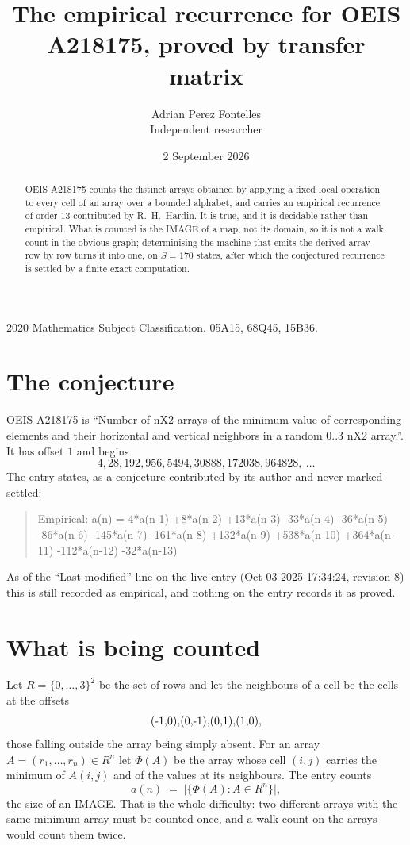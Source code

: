 \documentclass[11pt,a4paper]{article}
\title{The empirical recurrence for OEIS A218175, proved by transfer matrix}
\author{Adrian Perez Fontelles\\ \small Independent researcher}
\date{2 September 2026}
\theoremstyle{plain}
\theoremstyle{definition}
\begin{document}
\maketitle

\begin{abstract}
OEIS A218175 counts the distinct arrays obtained by applying a fixed local operation to every cell
of an array over a bounded alphabet, and carries an empirical recurrence of order $13$
contributed by R.~H.~Hardin. It is true, and it is decidable rather than empirical. What is
counted is the IMAGE of a map, not its domain, so it is not a walk count in the obvious graph;
determinising the machine that emits the derived array row by row turns it into one, on
$S=170$ states, after which the conjectured recurrence is settled by a finite exact
computation.
\end{abstract}

\noindent\small 2020 Mathematics Subject Classification. 05A15, 68Q45, 15B36.\normalsize

\section{The conjecture}

OEIS A218175 is ``Number of nX2 arrays of the minimum value of corresponding elements and their horizontal and vertical neighbors in a random 0..3 nX2 array.''. It has offset $1$ and begins
\[
4, 28, 192, 956, 5494, 30888, 172038, 964828,\ \dots
\]
The entry states, as a conjecture contributed by its author and never marked settled:
\begin{quote}
Empirical: a(n) = 4*a(n-1) +8*a(n-2) +13*a(n-3) -33*a(n-4) -36*a(n-5) -86*a(n-6) -145*a(n-7) -161*a(n-8) +132*a(n-9) +538*a(n-10) +364*a(n-11) -112*a(n-12) -32*a(n-13)
\end{quote}
As of the ``Last modified'' line on the live entry (Oct 03 2025 17:34:24, revision 8) this is still
recorded as empirical, and nothing on the entry records it as proved.

\section{What is being counted}

Let $R=\{0,\dots,3\}^{2}$ be the set of rows and let the neighbours of
a cell be the cells at the offsets
\[
$(-1,0)$, $(0,-1)$, $(0,1)$, $(1,0)$,
\]
those falling outside the array being simply absent. For an array
$A=(r_1,\dots,r_n)\in R^n$ let $\Phi(A)$ be the array whose cell $(i,j)$ carries the
minimum of $A(i,j)$ and of the values at its neighbours. The entry counts
\[
a(n)\;=\;\bigl|\{\Phi(A):A\in R^n\}\bigr| ,
\]
the size of an IMAGE. That is the whole difficulty: two different arrays with the same
minimum-array must be counted once, and a walk count on the arrays would count them twice.
\end{document}
